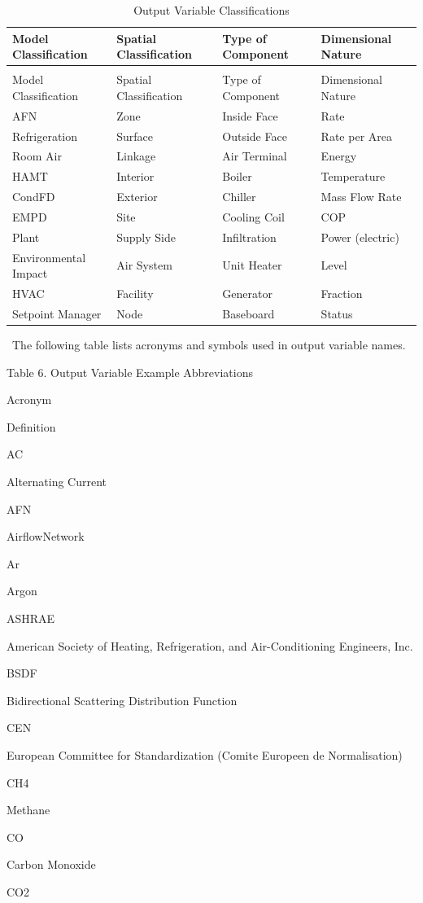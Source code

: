 \begin{longtable}[c]{p{1.5in}p{1.5in}p{1.5in}p{1.5in}}
\caption{Output Variable Classifications \label{table:output-variable-classifications}} \tabularnewline
\toprule 
Model Classification & Spatial Classification & Type of Component & Dimensional Nature \tabularnewline
\midrule
\endfirsthead

\caption[]{Output Variable Classifications} \tabularnewline
\toprule 
Model Classification & Spatial Classification & Type of Component & Dimensional Nature \tabularnewline
\midrule
\endhead

AFN & Zone & Inside Face & Rate \tabularnewline
Refrigeration & Surface & Outside Face & Rate per Area \tabularnewline
Room Air & Linkage & Air Terminal & Energy \tabularnewline
HAMT & Interior & Boiler & Temperature \tabularnewline
CondFD & Exterior & Chiller & Mass Flow Rate \tabularnewline
EMPD & Site & Cooling Coil & COP \tabularnewline
Plant & Supply Side & Infiltration & Power (electric) \tabularnewline
Environmental Impact & Air System & Unit Heater & Level \tabularnewline
HVAC & Facility & Generator & Fraction \tabularnewline
Setpoint Manager & Node & Baseboard & Status \tabularnewline
\bottomrule
\end{longtable}

~The following table lists acronyms and symbols used in output variable names.

Table 6. Output Variable Example Abbreviations

Acronym

Definition

AC

Alternating Current

AFN

AirflowNetwork

Ar

Argon

ASHRAE

American Society of Heating, Refrigeration, and Air-Conditioning Engineers, Inc.

BSDF

Bidirectional Scattering Distribution Function

CEN

European Committee for Standardization (Comite Europeen de Normalisation)

CH4

Methane

CO

Carbon Monoxide

CO2

